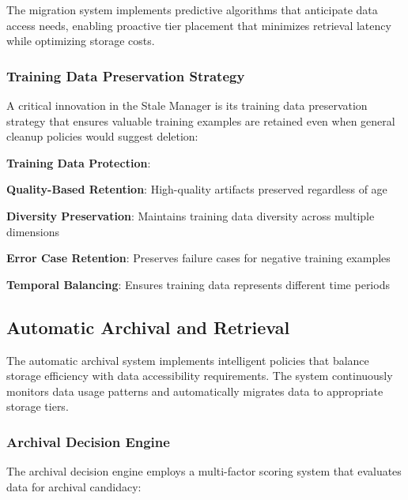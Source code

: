 The migration system implements predictive algorithms that anticipate data access needs, enabling proactive tier placement that minimizes retrieval latency while optimizing storage costs.

\subsubsection*{Training Data Preservation Strategy}

A critical innovation in the Stale Manager is its training data preservation strategy that ensures valuable training examples are retained even when general cleanup policies would suggest deletion:

\begin{alertbox}
\textbf{Training Data Protection}:
\begin{compactlist}
    \item \textbf{Quality-Based Retention}: High-quality artifacts preserved regardless of age
    \item \textbf{Diversity Preservation}: Maintains training data diversity across multiple dimensions
    \item \textbf{Error Case Retention}: Preserves failure cases for negative training examples
    \item \textbf{Temporal Balancing}: Ensures training data represents different time periods
\end{compactlist}
\end{alertbox}

\subsection*{Automatic Archival and Retrieval}

The automatic archival system implements intelligent policies that balance storage efficiency with data accessibility requirements. The system continuously monitors data usage patterns and automatically migrates data to appropriate storage tiers.

\subsubsection*{Archival Decision Engine}

The archival decision engine employs a multi-factor scoring system that evaluates data for archival candidacy:

